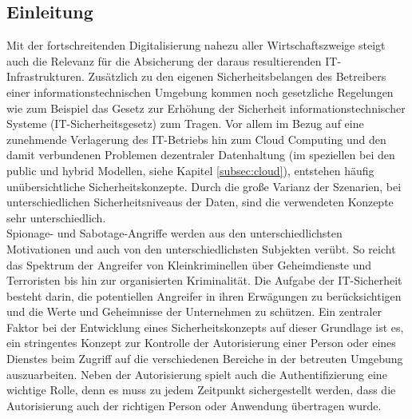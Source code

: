 \documentclass[
book,
a4paper,   
titlepage,  
halfparskip,
12pt        
]{scrartcl}
\begin{document}
\newpage
\begin{onehalfspacing} %
\pagestyle{fancy}
\fancyhf{} %
\fancyhead[L]{\rightmark} %
\fancyhead[R]{\thepage} %


\section{Einleitung}
\label{subsec:einfuehrung}
Mit der fortschreitenden Digitalisierung nahezu aller Wirtschaftszweige steigt auch die Relevanz für die Absicherung der daraus resultierenden \ac{IT}-Infrastrukturen. Zusätzlich zu den eigenen Sicherheitsbelangen des Betreibers einer informationstechnischen Umgebung kommen noch gesetzliche Regelungen wie zum Beispiel das Gesetz zur Erhöhung der Sicherheit informationstechnischer Systeme (IT-Sicherheitsgesetz)\cite{gesetz} zum Tragen. 
Vor allem im Bezug auf eine zunehmende Verlagerung des \ac{IT}-Betriebs hin zum Cloud Computing und den damit verbundenen Problemen dezentraler Datenhaltung (im speziellen bei den public und hybrid Modellen, siehe Kapitel \vref{subsec:cloud}), entstehen häufig unübersichtliche Sicherheitskonzepte. Durch die große Varianz der Szenarien, bei unterschiedlichen Sicherheitsniveaus der Daten, sind die verwendeten Konzepte sehr unterschiedlich.\cite[S. 7f]{risiko}\\
Spionage- und Sabotage-Angriffe werden aus den unterschiedlichsten Motivationen und auch von den unterschiedlichsten Subjekten verübt. So reicht das Spektrum der Angreifer von Kleinkriminellen über Geheimdienste und Terroristen bis hin zur organisierten Kriminalität. Die Aufgabe der \ac{IT}-Sicherheit besteht darin, die potentiellen Angreifer in ihren Erwägungen zu berücksichtigen und die Werte und Geheimnisse der Unternehmen zu schützen. Ein zentraler Faktor bei der Entwicklung eines Sicherheitskonzepts auf dieser Grundlage ist es, ein stringentes Konzept zur Kontrolle der Autorisierung einer Person oder eines Dienstes beim Zugriff auf die verschiedenen Bereiche in der betreuten Umgebung auszuarbeiten. Neben der Autorisierung spielt auch die Authentifizierung eine wichtige Rolle, denn es muss zu jedem Zeitpunkt sichergestellt werden, dass die Autorisierung auch der richtigen Person oder Anwendung übertragen wurde.\cite[S. 9]{risiko}\\

\end{onehalfspacing}
\end{document}
